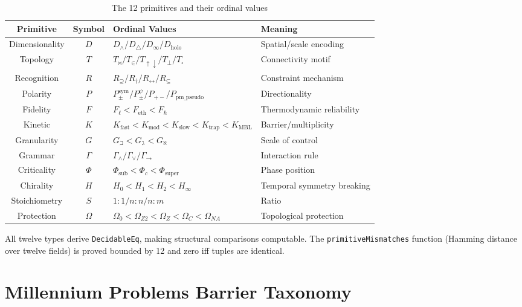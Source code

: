 \documentclass[11pt,a4paper]{article}
\begin{document}
\begin{table}[h!]
\centering
\caption{The 12 primitives and their ordinal values}
\label{tab:primitives}
\begin{tabular}{c c l l}
\toprule
\textbf{Primitive} & \textbf{Symbol} & \textbf{Ordinal Values} & \textbf{Meaning} \\
\midrule
Dimensionality & $D$ & $D_\wedge / D_\triangle / D_\infty / D_{\text{holo}}$ & Spatial/scale encoding \\
Topology & $T$ & $T_\bowtie / T_\in / T_{\uparrow\downarrow} / T_\perp / T_\square$ & Connectivity motif \\
Recognition & $R$ & $R_\supseteq / R_\dagger / R_\leftrightarrow / R_\subseteq$ & Constraint mechanism \\
Polarity & $P$ & $P_{\pm}^{\text{sym}} / P_{\pm}^{\psi} / P_{+-} / P_{\text{pm\_pseudo}}$ & Directionality \\
Fidelity & $F$ & $F_\ell < F_{\text{eth}} < F_{\hbar}$ & Thermodynamic reliability \\
Kinetic & $K$ & $K_{\text{fast}} < K_{\text{mod}} < K_{\text{slow}} < K_{\text{trap}} < K_{\text{MBL}}$ & Barrier/multiplicity \\
Granularity & $G$ & $G_{\beth} < G_{\gimel} < G_{\aleph}$ & Scale of control \\
Grammar & $\Gamma$ & $\Gamma_\land / \Gamma_\lor / \Gamma_\to$ & Interaction rule \\
Criticality & $\Phi$ & $\Phi_{\text{sub}} < \Phi_c < \Phi_{\text{super}}$ & Phase position \\
Chirality & $H$ & $H_0 < H_1 < H_2 < H_\infty$ & Temporal symmetry breaking \\
Stoichiometry & $S$ & $1{:}1 / n{:}n / n{:}m$ & Ratio \\
Protection & $\Omega$ & $\Omega_0 < \Omega_{Z2} < \Omega_Z < \Omega_C < \Omega_{NA}$ & Topological protection \\
\bottomrule
\end{tabular}
\end{table}

\noindent All twelve types derive \texttt{DecidableEq}, making structural comparisons computable. The \texttt{primitiveMismatches} function (Hamming distance over twelve fields) is proved bounded by 12 and zero iff tuples are identical.

\section{Millennium Problems Barrier Taxonomy}
\end{document}
